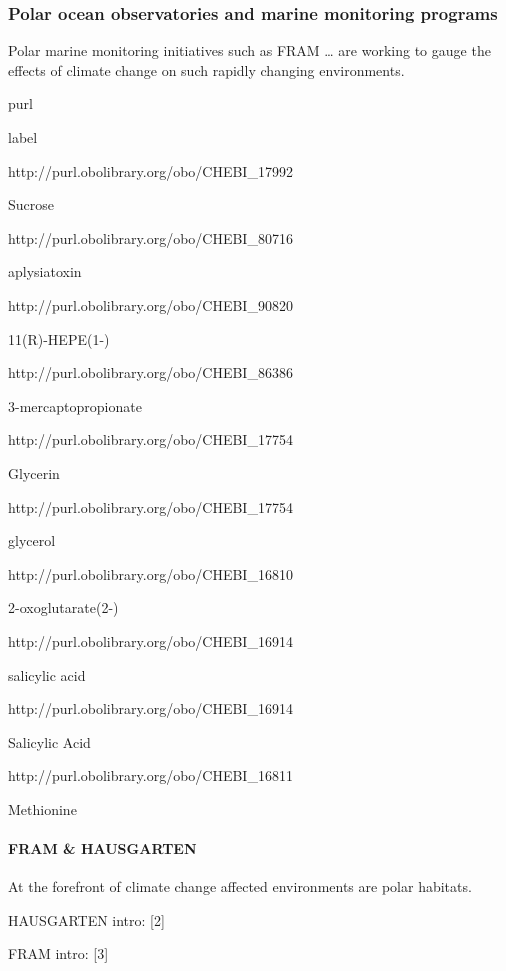 \documentclass[]{article}
\let\oldparagraph\paragraph
\renewcommand{\paragraph}[1]{\oldparagraph{#1}\mbox{}}
\begin{document}
\hypertarget{polar-ocean-observatories-and-marine-monitoring-programs}{%
\subsubsection{Polar ocean observatories and marine monitoring
programs}\label{polar-ocean-observatories-and-marine-monitoring-programs}}

Polar marine monitoring initiatives such as FRAM \ldots{} are working to
gauge the effects of climate change on such rapidly changing
environments.

purl

label

http://purl.obolibrary.org/obo/CHEBI\_17992

Sucrose

http://purl.obolibrary.org/obo/CHEBI\_80716

aplysiatoxin

http://purl.obolibrary.org/obo/CHEBI\_90820

11(R)-HEPE(1-)

http://purl.obolibrary.org/obo/CHEBI\_86386

3-mercaptopropionate

http://purl.obolibrary.org/obo/CHEBI\_17754

Glycerin

http://purl.obolibrary.org/obo/CHEBI\_17754

glycerol

http://purl.obolibrary.org/obo/CHEBI\_16810

2-oxoglutarate(2-)

http://purl.obolibrary.org/obo/CHEBI\_16914

salicylic acid

http://purl.obolibrary.org/obo/CHEBI\_16914

Salicylic Acid

http://purl.obolibrary.org/obo/CHEBI\_16811

Methionine

\hypertarget{fram-hausgarten}{%
\paragraph{FRAM \& HAUSGARTEN}\label{fram-hausgarten}}

At the forefront of climate change affected environments are polar
habitats.

HAUSGARTEN intro: {[}2{]}

FRAM intro: {[}3{]}
\end{document}
